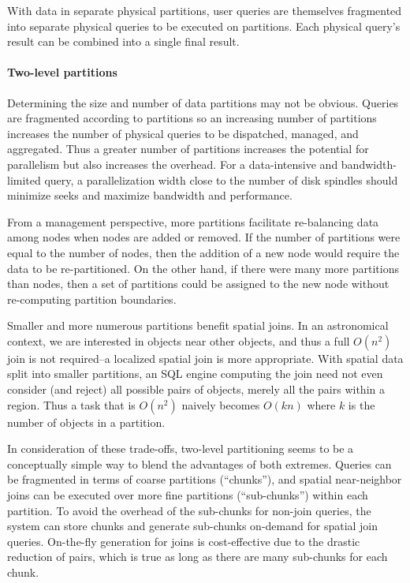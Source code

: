 \documentclass[DM,toc]{lsstdoc}
\begin{document}
With data in separate physical partitions, user queries are themselves
fragmented into separate physical queries to be executed on partitions.
Each physical query's result can be combined into a single final result.

\paragraph{Two-level partitions}\label{two-level-partitions}

Determining the size and number of data partitions may not be obvious.
Queries are fragmented according to partitions so an increasing number
of partitions increases the number of physical queries to be dispatched,
managed, and aggregated. Thus a greater number of partitions increases
the potential for parallelism but also increases the overhead. For a
data-intensive and bandwidth-limited query, a parallelization width
close to the number of disk spindles should minimize seeks and
maximize bandwidth and performance.

From a management perspective, more partitions facilitate re-balancing
data among nodes when nodes are added or removed. If the number of
partitions were equal to the number of nodes, then the addition of a new
node would require the data to be re-partitioned. On the other hand, if
there were many more partitions than nodes, then a set of partitions
could be assigned to the new node without re-computing partition
boundaries.

Smaller and more numerous partitions benefit spatial joins. In an
astronomical context, we are interested in objects near other objects,
and thus a full \(O(n^2)\) join is not required--a localized spatial
join is more appropriate. With spatial data split into smaller
partitions, an SQL engine computing the join need not even consider (and
reject) all possible pairs of objects, merely all the pairs within a
region. Thus a task that is \(O(n^2)\) naively becomes \(O(kn)\) where
\(k\) is the number of objects in a partition.

In consideration of these trade-offs, two-level partitioning seems to be
a conceptually simple way to blend the advantages of both extremes.
Queries can be fragmented in terms of coarse partitions (``chunks''),
and spatial near-neighbor joins can be executed over more fine
partitions (``sub-chunks'') within each partition. To avoid the overhead
of the sub-chunks for non-join queries, the system can store chunks and
generate sub-chunks on-demand for spatial join queries. On-the-fly
generation for joins is cost-effective due to the drastic reduction of
pairs, which is true as long as there are many sub-chunks for each
chunk.
\end{document}
